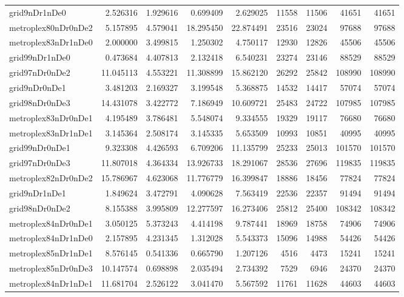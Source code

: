 \begin{longtable}{|l|r|r|r|r|r|r|r|r|}
grid9nDr1nDe0 & 2.526316 & 1.929616 & 0.699409 & 2.629025 & 11558 & 11506 & 41651 & 41651 \\
metroplex80nDr0nDe2 & 5.157895 & 4.579041 & 18.295450 & 22.874491 & 23516 & 23024 & 97688 & 97688 \\
metroplex83nDr1nDe0 & 2.000000 & 3.499815 & 1.250302 & 4.750117 & 12930 & 12826 & 45506 & 45506 \\
grid99nDr1nDe0 & 0.473684 & 4.407813 & 2.132418 & 6.540231 & 23274 & 23146 & 88529 & 88529 \\
grid97nDr0nDe2 & 11.045113 & 4.553221 & 11.308899 & 15.862120 & 26292 & 25842 & 108990 & 108990 \\
grid9nDr0nDe1 & 3.481203 & 2.169327 & 3.199548 & 5.368875 & 14532 & 14417 & 57074 & 57074 \\
grid98nDr0nDe3 & 14.431078 & 3.422772 & 7.186949 & 10.609721 & 25483 & 24722 & 107985 & 107985 \\
metroplex83nDr0nDe1 & 4.195489 & 3.786481 & 5.548074 & 9.334555 & 19329 & 19117 & 76680 & 76680 \\
metroplex83nDr1nDe1 & 3.145364 & 2.508174 & 3.145335 & 5.653509 & 10993 & 10851 & 40995 & 40995 \\
grid99nDr0nDe1 & 9.323308 & 4.426593 & 6.709206 & 11.135799 & 25233 & 25013 & 101570 & 101570 \\
grid97nDr0nDe3 & 11.807018 & 4.364334 & 13.926733 & 18.291067 & 28536 & 27696 & 119835 & 119835 \\
metroplex82nDr0nDe2 & 15.786967 & 4.623068 & 11.776779 & 16.399847 & 18886 & 18456 & 77824 & 77824 \\
grid9nDr1nDe1 & 1.849624 & 3.472791 & 4.090628 & 7.563419 & 22536 & 22357 & 91494 & 91494 \\
grid98nDr0nDe2 & 8.155388 & 3.995809 & 12.277597 & 16.273406 & 25812 & 25400 & 108342 & 108342 \\
metroplex84nDr0nDe1 & 3.050125 & 5.373243 & 4.414198 & 9.787441 & 18969 & 18758 & 74906 & 74906 \\
metroplex84nDr1nDe0 & 2.157895 & 4.231345 & 1.312028 & 5.543373 & 15096 & 14988 & 54426 & 54426 \\
metroplex85nDr1nDe1 & 8.576145 & 0.541336 & 0.665790 & 1.207126 & 4516 & 4473 & 15241 & 15241 \\
metroplex85nDr0nDe3 & 10.147574 & 0.698898 & 2.035494 & 2.734392 & 7529 & 6946 & 24370 & 24370 \\
metroplex84nDr1nDe1 & 11.681704 & 2.526122 & 3.041470 & 5.567592 & 11761 & 11628 & 44603 & 44603 \\

\end{longtable}
